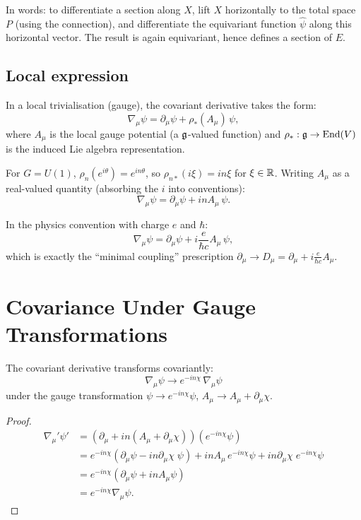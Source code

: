 In words: to differentiate a section along $X$, lift $X$ horizontally to the total space $P$ (using the connection), and differentiate the equivariant function $\hat{\psi}$ along this horizontal vector. The result is again equivariant, hence defines a section of $E$.

\subsection{Local expression}

In a local trivialisation (gauge), the covariant derivative takes the form:
\begin{equation}
\boxed{\nabla_\mu\psi = \partial_\mu\psi + \rho_*(A_\mu)\,\psi,}
\end{equation}
where $A_\mu$ is the local gauge potential (a $\mathfrak{g}$-valued function) and $\rho_*: \mathfrak{g} \to \operatorname{End}(V)$ is the induced Lie algebra representation.

For $G = U(1)$, $\rho_n(e^{i\theta}) = e^{in\theta}$, so $\rho_{n*}(i\xi) = in\xi$ for $\xi \in \mathbb{R}$. Writing $A_\mu$ as a real-valued quantity (absorbing the $i$ into conventions):
\begin{equation}
\boxed{\nabla_\mu\psi = \partial_\mu\psi + inA_\mu\,\psi.}
\end{equation}

In the physics convention with charge $e$ and $\hbar$:
\begin{equation}
\nabla_\mu\psi = \partial_\mu\psi + i\frac{e}{\hbar c}A_\mu\,\psi,
\end{equation}
which is exactly the ``minimal coupling'' prescription $\partial_\mu \to D_\mu = \partial_\mu + i\frac{e}{\hbar c}A_\mu$.

\section{Covariance Under Gauge Transformations}

\begin{theorem}
The covariant derivative transforms covariantly:
\begin{equation}
\nabla_\mu\psi \to e^{-in\chi}\,\nabla_\mu\psi
\end{equation}
under the gauge transformation $\psi \to e^{-in\chi}\psi$, $A_\mu \to A_\mu + \partial_\mu\chi$.
\end{theorem}

\begin{proof}
\begin{align}
\nabla_\mu'\psi' &= (\partial_\mu + in(A_\mu + \partial_\mu\chi))(e^{-in\chi}\psi) \\
&= e^{-in\chi}(\partial_\mu\psi - in\partial_\mu\chi\;\psi) + in A_\mu\,e^{-in\chi}\psi + in\partial_\mu\chi\;e^{-in\chi}\psi \\
&= e^{-in\chi}(\partial_\mu\psi + inA_\mu\psi) \\
&= e^{-in\chi}\nabla_\mu\psi.
\end{align}
\end{proof}

